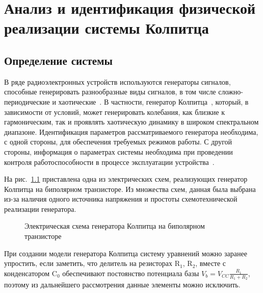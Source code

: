 \chapter{Анализ и идентификация физической реализации системы Колпитца}
\label{atu:ch:colpreal}


\section{Определение системы} %
\label{atu:s:colp_task}

В ряде радиоэлектронных устройств используются
генераторы сигналов, способные генерировать разнообразные виды  сигналов, в том числе
сложно-периодические и хаотические~\cite{dmitriev_gen_chaos}.
В частности, генератор  Колпитца~\cite{kennedy_chaos_colpitts,atu_asau21}, который, в
зависимости от условий,   может
генерировать  колебания,  как  близкие  к  гармоническим,  так  и  проявлять
хаотическую  динамику  в  широком  спектральном   диапазоне.   Идентификация
параметров рассматриваемого генератора  необходима,  с  одной  стороны,  для
обеспечения  требуемых  режимов  работы.  С  другой  стороны,  информация  о
параметрах системы необходима при проведении  контроля  работоспособности  в
процессе эксплуатации устройства~\cite{atu_apir2013}.

На рис.~\ref{atu:f:colp_schem} приставлена одна из электрических схем,
реализующих генератор Колпитца на биполярном транзисторе.
Из множества схем, данная была выбрана из-за наличия
одного источника напряжения и простоты схемотехнической реализации генератора.


\begin{figure}[htb!]
\begin{center}

\end{center}
\caption{Электрическая схема генератора Колпитца на биполярном транзисторе}
\label{atu:f:colp_schem}
\end{figure}

При создании модели генератора Колпитца систему уравнений можно
заранее упростить, если заметить, что
делитель на резисторах
$\mathrm{R}_1$, $\mathrm{R}_2$,
вместе с конденсатором
$\mathrm{C}_0$ обеспечивают
постоянство потенциала базы
$V_b = V_{CC} \frac{R_1}{R_1+R_2}$,
поэтому из дальнейшего рассмотрения данные элементы можно
исключить.

